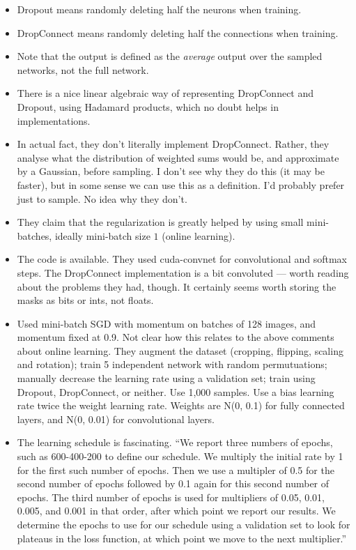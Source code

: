 \documentclass[12pt]{report}
\begin{document}
\begin{itemize}
\item Dropout means randomly deleting half the neurons
when training.  

\item DropConnect means randomly deleting half the connections when
  training.  

\item Note that the output is defined as the \emph{average} output
  over the sampled networks, not the full network.  

\item There is a nice linear algebraic way of representing DropConnect
  and Dropout, using Hadamard products, which no doubt helps in
  implementations.  

\item In actual fact, they don't literally implement DropConnect.
  Rather, they analyse what the distribution of weighted sums would
  be, and approximate by a Gaussian, before sampling.  I don't see why
  they do this (it may be faster), but in some sense we can use this
  as a definition.  I'd probably prefer just to sample.  No idea why
  they don't.

\item They claim that the regularization is greatly helped by using
  small mini-batches, ideally mini-batch size $1$ (online learning).

\item The code is available.  They used cuda-convnet for convolutional
  and softmax steps.  The DropConnect implementation is a bit
  convoluted --- worth reading about the problems they had, though.
  It certainly seems worth storing the masks as bits or ints, not
  floats.

\item Used mini-batch SGD with momentum on batches of 128 images, and
  momentum fixed at 0.9.  Not clear how this relates to the above
  comments about online learning.  They augment the dataset (cropping,
  flipping, scaling and rotation); train 5 independent network with
  random permutuations; manually decrease the learning rate using a
  validation set; train using Dropout, DropConnect, or neither.  Use
  1,000 samples.  Use a bias learning rate twice the weight learning
  rate.  Weights are N(0, 0.1) for fully connected layers, and N(0,
  0.01) for convolutional layers.

\item The learning schedule is fascinating.  ``We report three numbers
  of epochs, such as 600-400-200 to define our schedule.  We multiply
  the initial rate by 1 for the first such number of epochs.  Then we
  use a multipler of 0.5 for the second number of epochs followed by
  0.1 again for this second number of epochs.  The third number of
  epochs is used for multipliers of 0.05, 0.01, 0.005, and 0.001 in
  that order, after which point we report our results.  We determine
  the epochs to use for our schedule using a validation set to look
  for plateaus in the loss function, at which point we move to the
  next multiplier.''


\end{itemize}
\end{document}
